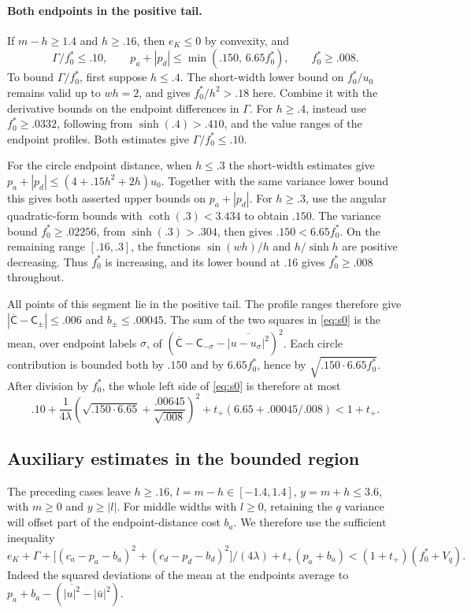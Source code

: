 \paragraph{Both endpoints in the positive tail.}
If $m-h\ge1.4$ and $h\ge.16$, then $e_K\le0$ by convexity, and
\[
 \Gamma/f_0^*\le .10,\qquad
 p_a+|p_d|\le \min(.150,\,6.65 f_0^*),\qquad f_0^*\ge.008 .
\]
To bound $\Gamma/f_0^*$, first suppose $h\le.4$. The short-width lower bound on $f_0^*/u_0$ remains valid up to $wh=2$, and gives $f_0^*/h^2>.18$ here. Combine it with the derivative bounds on the endpoint differences in $\Gamma$. For $h\ge.4$, instead use $f_0^*\ge.0332$, following from $\sinh(.4)>.410$, and the value ranges of the endpoint profiles. Both estimates give $\Gamma/f_0^*\le.10$.

For the circle endpoint distance, when $h\le.3$ the short-width estimates give $p_a+|p_d|\le(4+.15h^2+2h)u_0$. Together with the same variance lower bound this gives both asserted upper bounds on $p_a+|p_d|$. For $h\ge.3$, use the angular quadratic-form bounds with $\coth(.3)<3.434$ to obtain $.150$. The variance bound $f_0^*\ge.02256$, from $\sinh(.3)>.304$, then gives $.150<6.65f_0^*$. On the remaining range $[.16,.3]$, the functions $\sin(wh)/h$ and $h/\sinh h$ are positive decreasing. Thus $f_0^*$ is increasing, and its lower bound at $.16$ gives $f_0^*\ge.008$ throughout.

All points of this segment lie in the positive tail. The profile ranges therefore give $|\overline{\mathsf C}-\mathsf C_\pm|\le.006$ and $b_\pm\le.00045$. The sum of the two squares in \eqref{eq:s0} is the mean, over endpoint labels $\sigma$, of $(\overline{\mathsf C}-\mathsf C_{-\sigma} -\overline{|u-u_\sigma|^2})^2$. Each circle contribution is bounded both by $.150$ and by $6.65f_0^*$, hence by $\sqrt{.150\cdot6.65f_0^*}$. After division by $f_0^*$, the whole left side of \eqref{eq:s0} is therefore at most
\[
 .10+\frac1{4\lambda}\left(\sqrt{.150\cdot6.65}+\frac{.00645}{\sqrt{.008}}\right)^2+
 t_+(6.65+.00045/.008)<1+t_+ .
\]

\subsection{Auxiliary estimates in the bounded region}
\label{subsec:segments-auxiliary}

The preceding cases leave $h\ge .16$, $l=m-h\in[-1.4,1.4]$, $y=m+h\le3.6$, with $m\ge0$ and $y\ge|l|$. For middle widths with $l\ge0$, retaining the $q$ variance will offset part of the endpoint-distance cost $b_a$. We therefore use the sufficient inequality
\begin{equation}
 e_K+\Gamma+\big[(c_a-p_a-b_a)^2+(c_d-p_d-b_d)^2\big]/(4\lambda)+t_+(p_a+b_a)
     < (1+t_+)(f_0^*+V_q).                                                   \tag{sv}\label{eq:sv}
\end{equation}
Indeed the squared deviations of the mean at the endpoints average to $p_a+b_a-(\overline{|u|^2}-|\bar u|^2)$.


